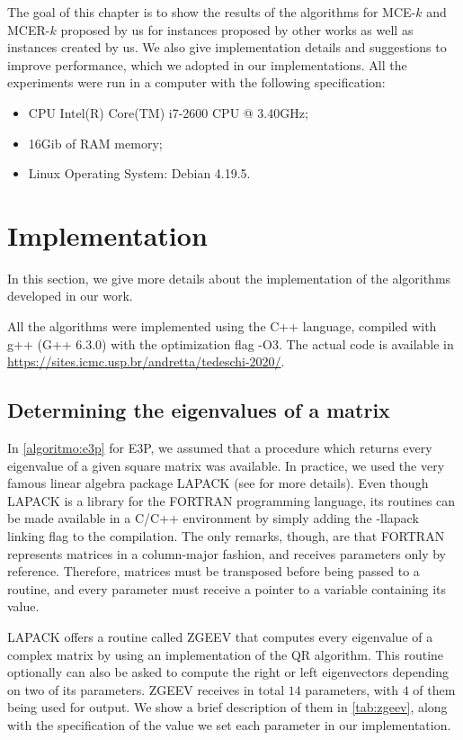 The goal of this chapter is to show the results of the algorithms for MCE-$k$ and MCER-$k$ proposed by us for instances proposed by other works as well as instances created by us. 
We also give implementation details and suggestions to improve performance, which we adopted in our implementations. All the experiments were run in a computer with the following specification:
\begin{itemize}
	\item CPU Intel(R) Core(TM) i7-2600 CPU @ 3.40GHz;
	\item 16Gib of RAM memory;
	\item Linux Operating System: Debian 4.19.5.
\end{itemize}

\section{Implementation}

In this section, we give more details about the implementation of the algorithms developed in our work.

All the algorithms were implemented using the C++ language, compiled with g++ (G++ 6.3.0) with the optimization flag -O3. The actual code is available in \url{https://sites.icmc.usp.br/andretta/tedeschi-2020/}.

\subsection{Determining the eigenvalues of a matrix}

In \autoref{algoritmo:e3p} for E3P, we assumed that a procedure which returns every eigenvalue of a given square matrix was available. In practice, we used the very famous linear algebra package LAPACK (see  for more details).
Even though LAPACK is a library for the FORTRAN programming language, its routines can be made available in a C/C++ environment by simply adding the -llapack linking flag to the compilation. The only remarks, though, are that FORTRAN represents matrices in a column-major fashion, and receives parameters only by reference. Therefore, matrices must be transposed before being passed to a routine, and every parameter must receive a pointer to a variable containing its value.

LAPACK offers a routine called ZGEEV that computes every eigenvalue of a complex matrix by using an implementation of the QR algorithm. 
This routine optionally can also be asked to compute the right or left eigenvectors depending on two of its parameters. 
ZGEEV receives in total $14$ parameters, with $4$ of them being used for output. We show a brief description of them in \autoref{tab:zgeev}, along with the specification of the value we set each parameter in our implementation.

